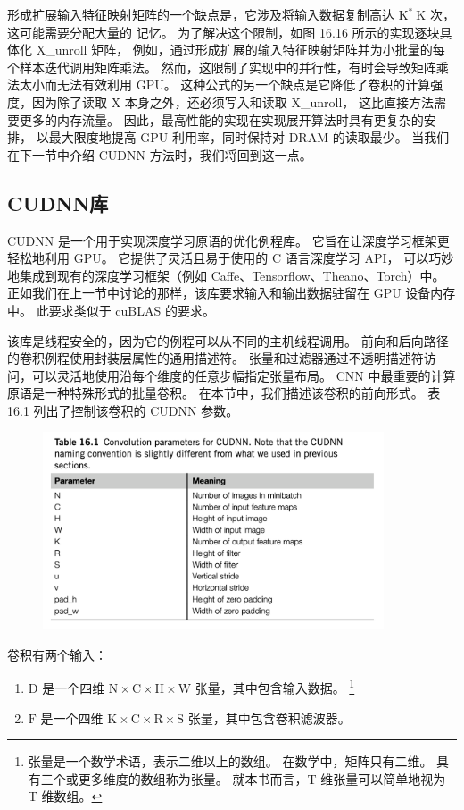 形成扩展输入特征映射矩阵的一个缺点是，它涉及将输入数据复制高达 $\mathrm{K}^{*} \mathrm{~K}$ 次，
这可能需要分配大量的 记忆。 为了解决这个限制，如图 16.16 所示的实现逐块具体化 X\_unroll 矩阵，
例如，通过形成扩展的输入特征映射矩阵并为小批量的每个样本迭代调用矩阵乘法。 
然而，这限制了实现中的并行性，有时会导致矩阵乘法太小而无法有效利用 GPU。 
这种公式的另一个缺点是它降低了卷积的计算强度，因为除了读取 $\mathrm{X}$ 本身之外，还必须写入和读取 X\_unroll，
这比直接方法需要更多的内存流量。 因此，最高性能的实现在实现展开算法时具有更复杂的安排，
以最大限度地提高 GPU 利用率，同时保持对 DRAM 的读取最少。 当我们在下一节中介绍 CUDNN 方法时，我们将回到这一点。

\subsection{CUDNN库}
CUDNN 是一个用于实现深度学习原语的优化例程库。 它旨在让深度学习框架更轻松地利用 GPU。 
它提供了灵活且易于使用的 C 语言深度学习 API， 
可以巧妙地集成到现有的深度学习框架（例如 Caffe、Tensorflow、Theano、Torch）中。 
正如我们在上一节中讨论的那样，该库要求输入和输出数据驻留在 GPU 设备内存中。 
此要求类似于 cuBLAS 的要求。

该库是线程安全的，因为它的例程可以从不同的主机线程调用。 前向和后向路径的卷积例程使用封装层属性的通用描述符。 
张量和过滤器通过不透明描述符访问，可以灵活地使用沿每个维度的任意步幅指定张量布局。 
$\mathrm{CNN}$ 中最重要的计算原语是一种特殊形式的批量卷积。 
在本节中，我们描述该卷积的前向形式。 表 16.1 列出了控制该卷积的 CUDNN 参数。

\begin{figure}[H]
	\centering
	\includegraphics[width=0.9\textwidth]{figs/F16-table.png}
\end{figure}

卷积有两个输入：
\begin{enumerate}
   \item $\mathrm{D}$ 是一个四维 $\mathrm{N} \times \mathrm{C} \times \mathrm{H} \times \mathrm{W}$ 张量，其中包含输入数据。
   \footnote{张量是一个数学术语，表示二维以上的数组。 在数学中，矩阵只有二维。 
   具有三个或更多维度的数组称为张量。 就本书而言，T 维张量可以简单地视为 T 维数组。}

   \item $\mathrm{F}$ 是一个四维 $\mathrm{K} \times \mathrm{C} \times \mathrm{R} \times \mathrm{S}$ 张量，其中包含卷积滤波器。
\end{enumerate}


